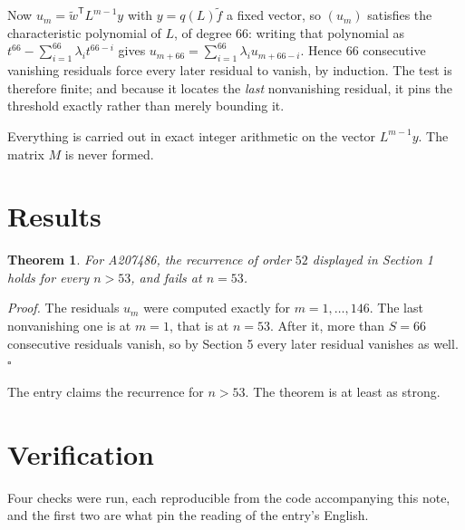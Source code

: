 \documentclass[11pt]{article}
\newtheorem{theorem}{Theorem}
\theoremstyle{definition}
\begin{document}
Now $u_m = \tilde w^{\mathsf T} L^{m-1} y$ with $y = q(L)\tilde f$ a fixed vector, so $(u_m)$ satisfies the characteristic polynomial of $L$, of degree $66$: writing that polynomial as $t^{66} - \sum_{i=1}^{66} \lambda_i t^{66-i}$ gives $u_{m+66} = \sum_{i=1}^{66} \lambda_i u_{m+66-i}$. Hence $66$ consecutive vanishing residuals force every later residual to vanish, by induction. The test is therefore finite; and because it locates the {\itshape last} nonvanishing residual, it pins the threshold exactly rather than merely bounding it.

Everything is carried out in exact integer arithmetic on the vector $L^{m-1}y$. The matrix $M$ is never formed.

\section{Results}

\begin{theorem} For A207486, the recurrence of order $52$ displayed in Section 1 holds for every $n > 53$, and fails at $n = 53$.\end{theorem}

{\itshape Proof.} The residuals $u_m$ were computed exactly for $m = 1,\dots,146$. The last nonvanishing one is at $m = 1$, that is at $n = 53$. After it, more than $S = 66$ consecutive residuals vanish, so by Section 5 every later residual vanishes as well. $\square$

The entry claims the recurrence for $n > 53$. The theorem is at least as strong.

\section{Verification}

Four checks were run, each reproducible from the code accompanying this note, and the first two are what pin the reading of the entry's English.
\end{document}
